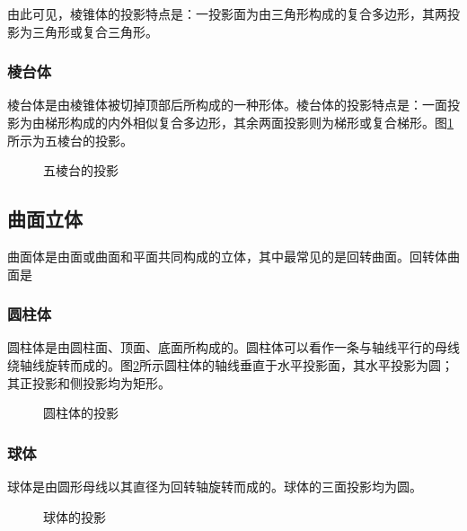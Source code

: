 由此可见，棱锥体的投影特点是：一投影面为由三角形构成的复合多边形，其两投影为三角形或复合三角形。
\subsubsection{棱台体}
棱台体是由棱锥体被切掉顶部后所构成的一种形体。棱台体的投影特点是：一面投影为由梯形构成的内外相似复合多边形，其余两面投影则为梯形或复合梯形。图\ref{fig:fivenentai} 所示为五棱台的投影。
\begin{figure}[htbp]
\centering
{}\hspace{30pt}
\caption{五棱台的投影}\label{fig:fivenentai}
\end{figure}

\subsection{曲面立体}
曲面体是由面或曲面和平面共同构成的立体，其中最常见的是回转曲面。回转体曲面是

\subsubsection{圆柱体}
圆柱体是由圆柱面、顶面、底面所构成的。圆柱体可以看作一条与轴线平行的母线绕轴线旋转而成的。图\ref{fig:yuanzhutix}所示圆柱体的轴线垂直于水平投影面，其水平投影为圆；其正投影和侧投影均为矩形。
\begin{figure}[htbp]
\centering
{}\hspace{30pt}
\caption{圆柱体的投影}\label{fig:yuanzhutix}
\end{figure}

\subsubsection{球体}
球体是由圆形母线以其直径为回转轴旋转而成的。球体的三面投影均为圆。

\begin{figure}[tbp]
\centering
{}\hspace{30pt}
\caption{球体的投影}\label{fig:qiout}
\end{figure}

\endinput